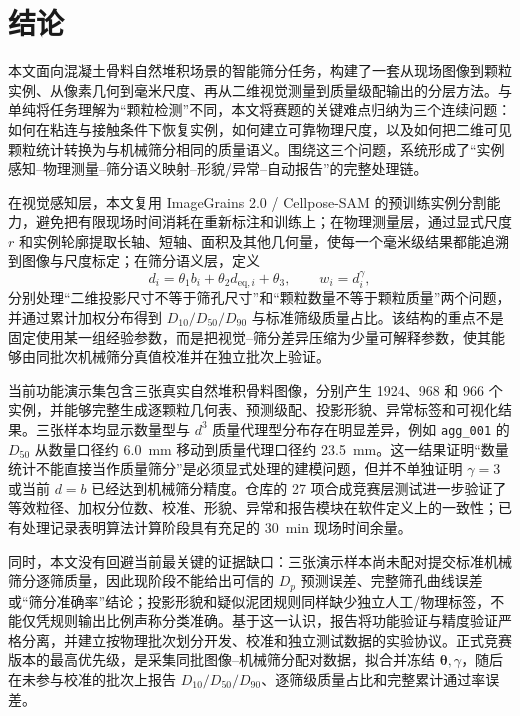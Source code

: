 \section{结论}
\label{sec:conclusion}

本文面向混凝土骨料自然堆积场景的智能筛分任务，构建了一套从现场图像到颗粒实例、从像素几何到毫米尺度、再从二维视觉测量到质量级配输出的分层方法。与单纯将任务理解为“颗粒检测”不同，本文将赛题的关键难点归纳为三个连续问题：如何在粘连与接触条件下恢复实例，如何建立可靠物理尺度，以及如何把二维可见颗粒统计转换为与机械筛分相同的质量语义。围绕这三个问题，系统形成了“实例感知--物理测量--筛分语义映射--形貌/异常--自动报告”的完整处理链。

在视觉感知层，本文复用 ImageGrains 2.0 / Cellpose-SAM 的预训练实例分割能力，避免把有限现场时间消耗在重新标注和训练上；在物理测量层，通过显式尺度 $r$ 和实例轮廓提取长轴、短轴、面积及其他几何量，使每一个毫米级结果都能追溯到图像与尺度标定；在筛分语义层，定义
\begin{equation}
 d_i=\theta_1 b_i+\theta_2 d_{\mathrm{eq},i}+\theta_3,
 \qquad
 w_i=d_i^{\gamma},
\end{equation}
分别处理“二维投影尺寸不等于筛孔尺寸”和“颗粒数量不等于颗粒质量”两个问题，并通过累计加权分布得到 $D_{10}/D_{50}/D_{90}$ 与标准筛级质量占比。该结构的重点不是固定使用某一组经验参数，而是把视觉--筛分差异压缩为少量可解释参数，使其能够由同批次机械筛分真值校准并在独立批次上验证。

当前功能演示集包含三张真实自然堆积骨料图像，分别产生 1924、968 和 966 个实例，并能够完整生成逐颗粒几何表、预测级配、投影形貌、异常标签和可视化结果。三张样本均显示数量型与 $d^3$ 质量代理型分布存在明显差异，例如 \texttt{agg\_001} 的 $D_{50}$ 从数量口径约 6.0~mm 移动到质量代理口径约 23.5~mm。这一结果证明“数量统计不能直接当作质量筛分”是必须显式处理的建模问题，但并不单独证明 $\gamma=3$ 或当前 $d=b$ 已经达到机械筛分精度。仓库的 27 项合成竞赛层测试进一步验证了等效粒径、加权分位数、校准、形貌、异常和报告模块在软件定义上的一致性；已有处理记录表明算法计算阶段具有充足的 30~min 现场时间余量。

同时，本文没有回避当前最关键的证据缺口：三张演示样本尚未配对提交标准机械筛分逐筛质量，因此现阶段不能给出可信的 $D_p$ 预测误差、完整筛孔曲线误差或“筛分准确率”结论；投影形貌和疑似泥团规则同样缺少独立人工/物理标签，不能仅凭规则输出比例声称分类准确。基于这一认识，报告将功能验证与精度验证严格分离，并建立按物理批次划分开发、校准和独立测试数据的实验协议。正式竞赛版本的最高优先级，是采集同批图像--机械筛分配对数据，拟合并冻结 $\boldsymbol{\theta},\gamma$，随后在未参与校准的批次上报告 $D_{10}/D_{50}/D_{90}$、逐筛级质量占比和完整累计通过率误差。

